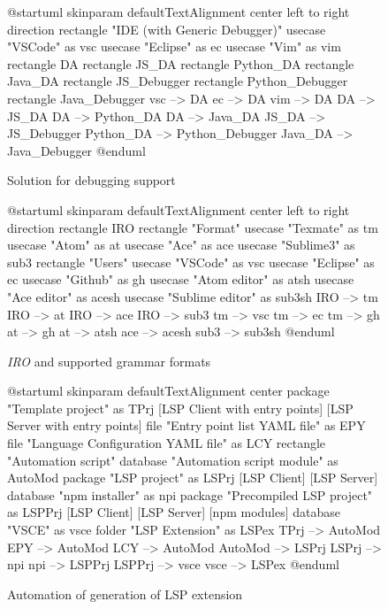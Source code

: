 \ifsolDbg%
\begin{figure}
    \begin{plantuml}
      @startuml
      skinparam defaultTextAlignment center
      left to right direction
      rectangle "IDE (with Generic Debugger)" {
        usecase "VSCode" as vsc
        usecase "Eclipse" as ec
        usecase "Vim" as vim
      }
      rectangle DA
      rectangle JS_DA
      rectangle Python_DA
      rectangle Java_DA
      rectangle JS_Debugger
      rectangle Python_Debugger
      rectangle Java_Debugger
      vsc --> DA
      ec --> DA
      vim --> DA
      DA --> JS_DA
      DA --> Python_DA
      DA --> Java_DA
      JS_DA --> JS_Debugger 
      Python_DA --> Python_Debugger
      Java_DA --> Java_Debugger
      @enduml
    \end{plantuml}
    \caption{Solution for debugging support\cite{dap}}
    \label{solDbg}
\end{figure}
\fi%

\ifiro%
\begin{figure}
    \begin{plantuml}
      @startuml
      skinparam defaultTextAlignment center
      left to right direction
      rectangle IRO
      rectangle "Format" {
        usecase "Texmate" as tm
        usecase "Atom" as at
        usecase "Ace" as ace
        usecase "Sublime3" as sub3
      }
      rectangle "Users" {
        usecase "VSCode" as vsc
        usecase "Eclipse" as ec
        usecase "Github" as gh
        usecase "Atom editor" as atsh
        usecase "Ace editor" as acesh
        usecase "Sublime editor" as sub3sh
      }
      IRO --> tm
      IRO --> at
      IRO --> ace
      IRO --> sub3
      tm --> vsc
      tm --> ec
      tm --> gh
      at --> gh
      at --> atsh
      ace --> acesh
      sub3 --> sub3sh
      @enduml
    \end{plantuml}
    \caption{{\it IRO}\cite{iro} and supported grammar formats}
    \label{iro}
\end{figure}
\fi%

\ifauto%
\begin{figure}
    \begin{plantuml}
      @startuml
      skinparam defaultTextAlignment center
      package "Template project" as TPrj {
        [LSP Client with entry points]
        [LSP Server with entry points]
      }
      file "Entry point list YAML file" as EPY
      file "Language Configuration YAML file" as LCY
      rectangle "Automation script" {
      database "Automation script module" as AutoMod
      package "LSP project" as LSPrj {
        [LSP Client]
        [LSP Server]
      }
      database "npm installer" as npi
      package "Precompiled LSP project" as LSPPrj {
        [LSP Client]
        [LSP Server]
        [npm modules]
      }
      database "VSCE" as vsce
      }
      folder "LSP Extension" as LSPex  
      TPrj --> AutoMod
      EPY --> AutoMod
      LCY --> AutoMod
      AutoMod --> LSPrj
      LSPrj --> npi
      npi --> LSPPrj
      LSPPrj --> vsce
      vsce --> LSPex
      @enduml
    \end{plantuml}
    \caption{Automation of generation of LSP extension}
    \label{auto}
  \end{figure}
\fi%

